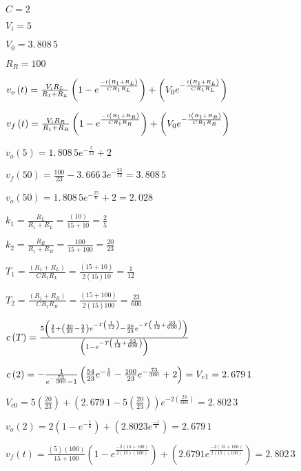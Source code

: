 \documentclass{article}
\begin{document}
$C=2$

$V_{i}=5$

$V_{0}=3.\,\allowbreak 808\,5$

$R_{R}=100$

$v_{o}\left( t\right) =\frac{V_{i}R_{L}}{R_{1}+R_{L}}\left( 1-e^{\frac{%
-t\left( R_{1}+R_{L}\right) }{CR_{1}R_{L}}}\right) +\left( V_{0}e^{-\frac{%
t\left( R_{1}+R_{L}\right) }{CR_{1}R_{L}}}\right) $

$v_{f}\left( t\right) =\frac{V_{i}R_{R}}{R_{1}+R_{R}}\left( 1-e^{\frac{%
-t\left( R_{1}+R_{R}\right) }{CR_{1}R_{R}}}\right) +\left( V_{0}e^{-\frac{%
t\left( R_{1}+R_{R}\right) }{CR_{1}R_{R}}}\right) $

$v_{o}(5)=\allowbreak 1.\,\allowbreak 808\,5e^{-\frac{5}{12}}+2$

$v_{f}\left( 50\right) \allowbreak =\allowbreak \frac{100}{23}%
-3.\,\allowbreak 666\,3e^{-\frac{23}{12}}\allowbreak =\allowbreak
3.\,\allowbreak 808\,5$

$v_{o}\left( 50\right) =\allowbreak 1.\,\allowbreak 808\,5e^{-\frac{25}{6}%
}+2=\allowbreak 2.\,\allowbreak 028$

$k_{1}=\frac{R_{L}}{R_{1}+R_{L}}=\frac{\left( 10\right) }{15+10}=\allowbreak 
\frac{2}{5}$

$k_{2}=\frac{R_{R}}{R_{1}+R_{R}}=\frac{100}{15+100}=\allowbreak \frac{20}{23}
$

$T_{1}=\frac{\left( R_{1}+R_{L}\right) }{CR_{1}R_{L}}=\frac{\left(
15+10\right) }{2\left( 15\right) 10}=\allowbreak \frac{1}{12}$

$T_{2}=\frac{\left( R_{1}+R_{R}\right) }{CR_{1}R_{R}}=\frac{\left(
15+100\right) }{2\left( 15\right) 100}=\allowbreak \frac{23}{600}$

$c\left( T\right) =\frac{5\left( \frac{2}{5}+\left( \frac{20}{23}-\frac{2}{5}%
\right) e^{-T\left( \frac{1}{12}\right) }-\frac{20}{23}e^{-T\left( \frac{1}{%
12}+\frac{23}{600}\right) }\right) }{\left( 1-e^{-T\left( \frac{1}{12}+\frac{%
23}{600}\right) }\right) }$

$c\left( 2\right) =\allowbreak -\frac{1}{e^{-\frac{73}{300}}-1}\left( \frac{%
54}{23}e^{-\frac{1}{6}}-\frac{100}{23}e^{-\frac{73}{300}}+2\right)
\allowbreak =V_{c1}\allowbreak =2.\,\allowbreak 679\,1$

$V_{c0}=5\left( \frac{20}{23}\right) +\left( 2.\,\allowbreak 679\,1-5\left( 
\frac{20}{23}\right) \right) e^{-2\left( \frac{23}{600}\right) }=\allowbreak
2.\,\allowbreak 802\,3$

$v_{o}\left( 2\right) =2\left( 1-e^{-\frac{1}{6}}\right) +\left( \allowbreak
2.8023e^{\frac{-1}{6}}\right) =\allowbreak 2.\,\allowbreak 679\,1$

$v_{f}\left( t\right) =\frac{\left( 5\right) \left( 100\right) }{15+100}%
\left( 1-e^{\frac{-2\left( 15+100\right) }{2\left( 15\right) \left(
100\right) }}\right) +\left( 2.6791e^{\frac{-2\left( 15+100\right) }{2\left(
15\right) \left( 100\right) }}\right) =\allowbreak 2.\,\allowbreak 802\,3$
\end{document}
